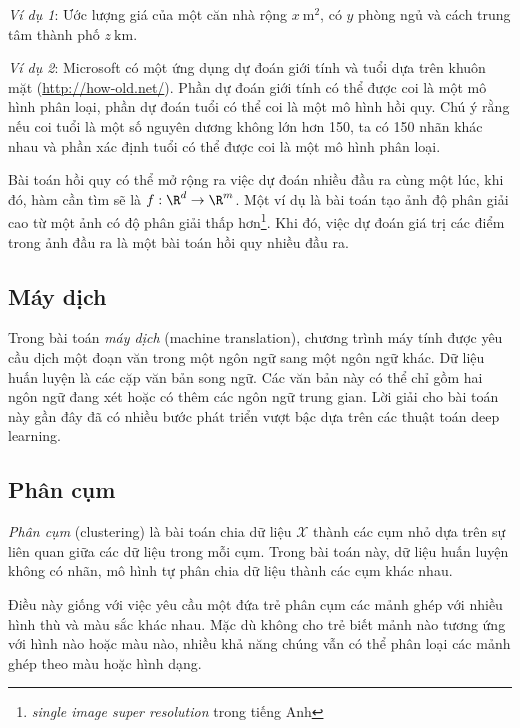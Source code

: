 \textit{Ví dụ 1}: Ước lượng giá của một căn nhà rộng $x ~ \text{m}^2$, có $y$
phòng ngủ và cách trung tâm thành phố $z~ \text{km}$.

\textit{Ví dụ 2}: Microsoft có một ứng dụng dự đoán giới tính và tuổi dựa trên
khuôn mặt (\url{http://how-old.net/}). Phần dự đoán giới tính có thể được coi là
một mô hình phân loại, phần dự đoán tuổi có thể coi là một mô hình hồi quy. Chú ý rằng nếu coi tuổi là một số nguyên dương không lớn hơn 150, ta có 150
nhãn khác nhau và phần xác định tuổi có thể được coi là một mô hình phân loại.

Bài toán hồi quy có thể mở rộng ra việc dự đoán nhiều đầu ra cùng một lúc,
khi đó, hàm cần tìm sẽ là $f: \R^d \rightarrow \R^m$. Một ví dụ là bài toán
{tạo ảnh độ phân giải cao} từ một ảnh có độ phân giải thấp hơn\footnote{\textit{single image super resolution} trong tiếng Anh}. Khi đó, việc dự đoán giá trị các điểm trong ảnh đầu ra là một bài toán hồi quy nhiều đầu ra. 




\subsection{Máy dịch}
Trong bài toán \textit{máy dịch} (machine translation), chương trình máy tính được yêu cầu dịch một đoạn văn trong
một ngôn ngữ sang một ngôn ngữ khác. Dữ liệu huấn luyện là các cặp văn bản song
ngữ. Các văn bản này có thể chỉ gồm hai ngôn ngữ đang xét hoặc có thêm các ngôn
ngữ trung gian. Lời giải cho bài toán này gần đây đã có nhiều bước phát triển
vượt bậc dựa trên các thuật toán deep learning.

\subsection{Phân cụm}
\textit{Phân cụm} (clustering) là bài toán chia dữ liệu $\mathcal{X}$ thành các cụm nhỏ dựa trên sự liên
quan giữa các dữ liệu trong mỗi cụm. Trong bài toán này, dữ liệu huấn luyện không có nhãn, mô hình tự phân chia dữ liệu thành các cụm khác nhau.

Điều này giống với việc yêu cầu một đứa trẻ phân cụm các mảnh ghép với nhiều hình thù và màu sắc khác nhau. Mặc dù không cho trẻ biết mảnh nào tương ứng
với hình nào hoặc màu nào, nhiều khả năng chúng vẫn có thể phân loại các mảnh
ghép theo màu hoặc hình dạng.


